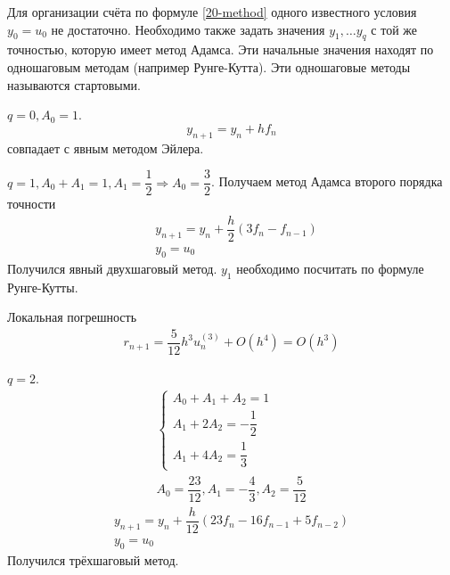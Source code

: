 Для организации счёта по формуле \eqref{20-method} одного известного условия
$y_0 = u_0$ не достаточно. Необходимо также задать значения $y_1, \ldots y_q$ с
той же точностью, которую имеет метод Адамса. Эти начальные значения находят
по одношаговым методам (например Рунге-Кутта). Эти одношаговые методы называются
стартовыми.

\begin{examples}
  \item $q = 0, A_0 = 1$.
  \begin{equation}
    y_{n + 1} = y_n + hf_n
  \end{equation}
  совпадает с явным методом Эйлера.
  \item $q = 1, A_0 + A_1 = 1, A_1 = \dfrac{1}{2} \Rightarrow A_0 = \dfrac{3}{2}$.
  Получаем метод Адамса второго порядка точности
  \begin{equation}
    \begin{split}
      &y_{n + 1} = y_n + \dfrac{h}{2}(3f_n - f_{n - 1})\\
      &y_0 = u_0
    \end{split}
  \end{equation}
  Получился явный двухшаговый метод. $y_1$ необходимо посчитать по формуле
  Рунге-Кутты.

  Локальная погрешность
  \begin{align*}
    r_{n + 1} = \dfrac{5}{12}h^3u_n^{(3)} + O(h^4) = O(h^3)
  \end{align*}

  \item $q = 2$.
  \begin{align*}
    \begin{cases}
      A_0 + A_1 + A_2 = 1\\
      A_1 + 2A_2 = -\dfrac{1}{2}\\
      A_1 + 4A_2 = \dfrac{1}{3}
    \end{cases}\\
    A_0 = \dfrac{23}{12}, A_1 = -\dfrac{4}{3}, A_2 = \dfrac{5}{12}
  \end{align*}
  \begin{equation}
    \begin{split}
      y_{n + 1} = y_n + \dfrac{h}{12}(23f_n - 16f_{n - 1} + 5f_{n - 2})\\
      y_0 = u_0
    \end{split}
  \end{equation}
  Получился трёхшаговый метод.
\end{examples}

